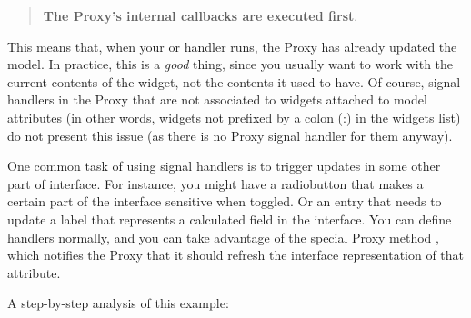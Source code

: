\documentclass[a4paper]{howto}
\begin{document}
\begin{quotation}
{\bf The Proxy's internal callbacks are executed first}.
\end{quotation}

This means that, when your  or  handler
runs, the Proxy has already updated the model. In practice, this is a
{\it good} thing, since you usually want to work with the current
contents of the widget, not the contents it used to have. Of course,
signal handlers in the Proxy that are not associated to widgets attached
to model attributes (in other words, widgets not prefixed by a colon
(:) in the widgets list) do not present this issue (as there is no Proxy
signal handler for them anyway).

One common task of using signal handlers is to trigger updates in some
other part of interface. For instance, you might have a radiobutton that
makes a certain part of the interface sensitive when toggled. Or an
entry that needs to update a label that represents a calculated field in
the interface. You can define handlers normally, and you can take
advantage of the special Proxy method , which notifies the Proxy that it should refresh the
interface representation of that attribute.



A step-by-step analysis of this example:
\end{document}
